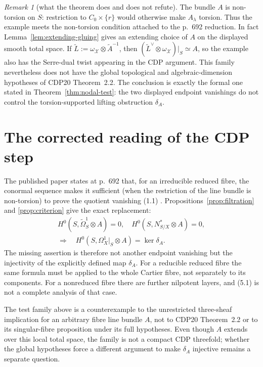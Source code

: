 \documentclass[11pt]{amsart}
\theoremstyle{plain}
\theoremstyle{definition}
\theoremstyle{remark}
\newtheorem{remark}[theorem]{Remark}
\begin{document}
\begin{remark}[what the theorem does and does not refute]
\label{rem:scope}
The bundle $A$ is non-torsion on $S$: restriction to
\(C_0\times\{r\}\) would otherwise make $A_\lambda$ torsion.  Thus the
example meets the non-torsion condition attached to the p.~692 reduction.
In fact Lemma~\ref{lem:extending-gluing} gives an extending choice of $A$ on
the displayed smooth total space.  If $\widetilde L:=\omega_{\mathcal X}\otimes
\widetilde A^{-1}$, then
$(\widetilde L^\vee\otimes\omega_{\mathcal X})|_S\simeq A$, so the example
also has the Serre-dual twist appearing in the CDP argument.  This family
nevertheless does not have
the global topological and algebraic-dimension hypotheses of CDP20
Theorem~2.2.  The conclusion is exactly the formal one stated in
Theorem~\ref{thm:nodal-test}: the two displayed endpoint vanishings do not
control the torsion-supported lifting obstruction $\delta_A$.
\end{remark}

\section{The corrected reading of the CDP step}

The published paper states at p.~692 that, for an irreducible reduced fibre,
the conormal sequence makes it sufficient (when the restriction of the line
bundle is non-torsion) to prove the quotient vanishing (1.1)
\cite{CDP2020}.  Propositions~\ref{prop:filtration} and
\ref{prop:criterion} give the exact replacement:
\[
\begin{gathered}
 H^0(S,\widetilde\Omega^1_S\otimes A)=0,
 \quad H^0(S,N^*_{S/X}\otimes A)=0,\\[-2pt]
 \Longrightarrow\quad
 H^0(S,\Omega^1_X|_S\otimes A)=\ker\delta_A.
\end{gathered}
\tag{5.1}
\]
The missing assertion is therefore not another endpoint vanishing but the
injectivity of the explicitly defined map $\delta_A$.  For a reducible
reduced fibre the same formula must be applied to the whole Cartier fibre,
not separately to its components.  For a nonreduced fibre there are further
nilpotent layers, and (5.1) is not a complete analysis of that case.

The test family above is a counterexample to the unrestricted three-sheaf
implication for an arbitrary fibre line bundle $A$, not to CDP20
Theorem~2.2 or to its singular-fibre proposition under its full hypotheses.
Even though $A$ extends over this local total space, the family is not a
compact CDP threefold; whether the global hypotheses force a different
argument to make $\delta_A$ injective remains a separate question.
\end{document}
